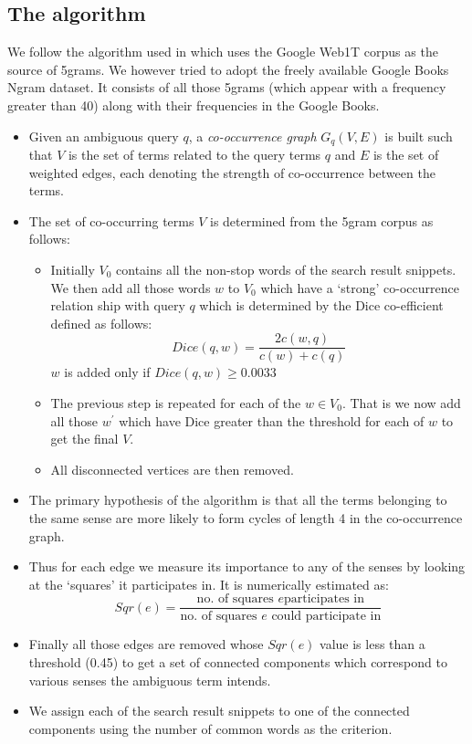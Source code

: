 \documentclass[a4paper,12pt]{report}
\begin{document}
\subsection{The algorithm}
We follow the algorithm used in \cite{navigli} which uses the Google
Web1T corpus as the source of 5grams. We however tried to adopt the
freely available Google Books Ngram dataset. It consists of all those
5grams (which appear with a frequency greater than 40) along with
their frequencies in the Google Books.
\begin{itemize}
  \item Given an ambiguous query $q$, a {\it co-occurrence graph}
    $G_q(V,E)$ is built such that $V$ is the set of terms related to
    the query terms $q$ and $E$ is the set of weighted edges, each
    denoting the strength of co-occurrence between the terms.
  \item The set of co-occurring terms $V$ is determined from the
    5gram corpus as follows:
    \begin{itemize}
      \item Initially $V_0$ contains all the non-stop words of the
        search result snippets. We then add all those words $w$ to
        $V_0$ which have a `strong' co-occurrence relation ship with
        query $q$ which is determined by the Dice co-efficient defined
        as follows:
        \begin{equation*}
          Dice(q,w) = \frac{2c(w,q)}{c(w) + c(q)}
        \end{equation*}
        $w$ is added only if $Dice(q,w) \ge 0.0033$
      \item The previous step is repeated for each of the $w \in
        V_0$. That is we now add all those $w^\prime$ which have Dice
        greater than the threshold for each of $w$ to get the final
        $V$.
      \item All disconnected vertices are then removed.
    \end{itemize}
     \item The primary hypothesis of the algorithm is that all the
        terms belonging to the same sense are more likely to form
        cycles of length 4 in the co-occurrence graph.
     \item Thus for each edge we measure its importance to any of the
        senses by looking at the `squares' it participates in. It is
        numerically estimated as:
      \begin{equation*}
          Sqr(e) = \frac{\mbox{no. of squares $e$
              participates in}}{\mbox{no. of squares $e$ could
              participate in}}
       \end{equation*}
     \item Finally all those edges are removed whose $Sqr(e)$ value
        is less than a threshold (0.45) to get a set of connected
        components which correspond to various senses the ambiguous
        term intends.
     \item We assign each of the search result snippets to one of the
       connected components using the number of common words as the
       criterion. 
\end{itemize}
\end{document}
